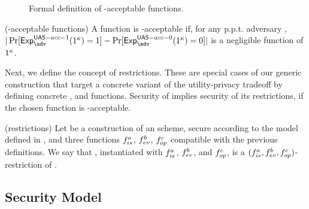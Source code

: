 \begin{figure}[ht!]
  \centering  
  \label{fig:uas-acceptable}
  \caption{Formal definition of \UAS-acceptable \fissue functions.}
\end{figure}

\begin{definition}{(\UAS-acceptable \fissue functions)}
  \label{def:uas-acc-func}
  A \fissue function is \UAS-acceptable if, for any p.p.t. adversary \adv,
  $|\Pr[\Exp^{\UAS-acc-1}_\adv(1^\secpar)=1]-\Pr[\Exp^{\UAS-acc-0}_\adv
  (1^\secpar)=0]|$ is a negligible function of $1^\kappa$.
\end{definition}

Next, we define the concept of \CUASGen restrictions. These are special
cases of our generic construction that target a concrete variant of the
utility-privacy tradeoff by defining concrete \fissue, \feval and \finsp
functions. Security of \CUASGen implies security of its restrictions, if
the chosen \fissue function is \CUASGen-acceptable.

\begin{definition}{(\CUASGen restrictions)}
  \label{def:uas-restrictions}
  Let \CUASGen be a construction of an \UAS scheme, secure according to
  the model defined in , and three functions $f_{is}^a$,
  $f_{ev}^b$, $f_{op}^c$ compatible with the previous definitions. We say that
  \CUASGen, instantiated with $f_{is}^a$, $f_{ev}^b$, and $f_{op}^c$, is a
  $(f_{is}^a,f_{ev}^b,f_{op}^c)$-restriction of \CUASGen.
\end{definition}

\subsection{Security Model}
\label{ssec:model-uas}

